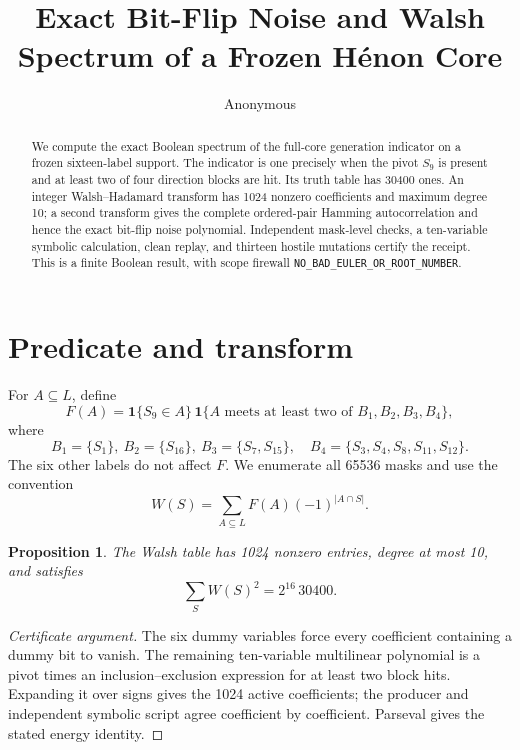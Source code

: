 \documentclass[10pt]{article}
\title{Exact Bit-Flip Noise and Walsh Spectrum of a Frozen H\'enon Core}
\author{Anonymous}
\date{}
\newtheorem{proposition}{Proposition}
\begin{document}
\maketitle

\begin{abstract}
We compute the exact Boolean spectrum of the full-core generation indicator
on a frozen sixteen-label support.  The indicator is one precisely when the
pivot $S_9$ is present and at least two of four direction blocks are hit.
Its truth table has 30400 ones.  An integer Walsh--Hadamard transform has
1024 nonzero coefficients and maximum degree 10; a second transform gives the
complete ordered-pair Hamming autocorrelation and hence the exact bit-flip
noise polynomial.  Independent mask-level checks, a ten-variable symbolic
calculation, clean replay, and thirteen hostile mutations certify the receipt.
This is a finite Boolean result, with scope firewall
\texttt{NO\_BAD\_EULER\_OR\_ROOT\_NUMBER}.
\end{abstract}

\section{Predicate and transform}
For $A\subseteq L$, define
\[
 F(A)=\mathbf1\{S_9\in A\}\,\mathbf1\{\text{$A$ meets at least two of }
 B_1,B_2,B_3,B_4\},
\]
where
\[
B_1=\{S_1\},\ B_2=\{S_{16}\},\ B_3=\{S_7,S_{15}\},\quad
B_4=\{S_3,S_4,S_8,S_{11},S_{12}\}.
\]
The six other labels do not affect $F$.  We enumerate all 65536 masks and use
the convention
\[
 W(S)=\sum_{A\subseteq L}F(A)(-1)^{|A\cap S|}.
\]

\begin{proposition}
The Walsh table has 1024 nonzero entries, degree at most 10, and satisfies
\[
\sum_S W(S)^2=2^{16}\,30400.
\]
\end{proposition}
\begin{proof}[Certificate argument]
The six dummy variables force every coefficient containing a dummy bit to
vanish.  The remaining ten-variable multilinear polynomial is a pivot times
an inclusion--exclusion expression for at least two block hits.  Expanding it
over signs gives the 1024 active coefficients; the producer and independent
symbolic script agree coefficient by coefficient.  Parseval gives the stated
energy identity.
\end{proof}
\end{document}
